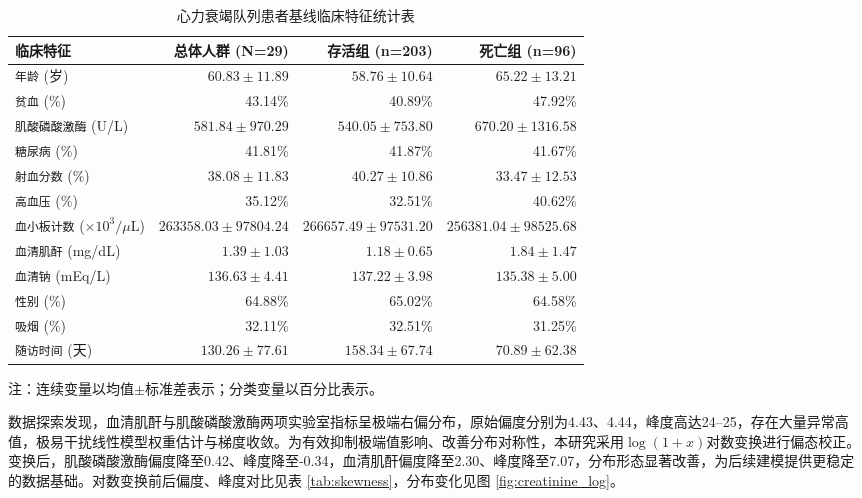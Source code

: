 \documentclass[11pt,a4paper]{ctexart} %
\begin{document}
\begin{table}[H]
\centering
\caption{心力衰竭队列患者基线临床特征统计表}
\label{tab:baseline}
\small
\begin{tabular}{lrrr}
\toprule
\textbf{临床特征} & \textbf{总体人群 (N=29)} & \textbf{存活组 (n=203)} & \textbf{死亡组 (n=96)} \\
\midrule
\texttt{年龄} (岁) & $60.83 \pm 11.89$ & $58.76 \pm 10.64$ & $65.22 \pm 13.21$ \\
\texttt{贫血} (\%) & \num{43.14}\% & \num{40.89}\% & \num{47.92}\% \\
\texttt{肌酸磷酸激酶} (U/L) & $581.84 \pm 970.29$ & $540.05 \pm 753.80$ & $670.20 \pm 1316.58$ \\
\texttt{糖尿病} (\%) & \num{41.81}\% & \num{41.87}\% & \num{41.67}\% \\
\texttt{射血分数} (\%) & $38.08 \pm 11.83$ & $40.27 \pm 10.86$ & $33.47 \pm 12.53$ \\
\texttt{高血压} (\%) & \num{35.12}\% & \num{32.51}\% & \num{40.62}\% \\
\texttt{血小板计数} ($\times 10^3/\mu\text{L}$) & $263358.03 \pm 97804.24$ & $266657.49 \pm 97531.20$ & $256381.04 \pm 98525.68$ \\
\texttt{血清肌酐} (mg/dL) & $1.39 \pm 1.03$ & $1.18 \pm 0.65$ & $1.84 \pm 1.47$ \\
\texttt{血清钠} (mEq/L) & $136.63 \pm 4.41$ & $137.22 \pm 3.98$ & $135.38 \pm 5.00$ \\
\texttt{性别} (\%) & \num{64.88}\% & \num{65.02}\% & \num{64.58}\% \\
\texttt{吸烟} (\%) & \num{32.11}\% & \num{32.51}\% & \num{31.25}\% \\
\texttt{随访时间} (天) & $130.26 \pm 77.61$ & $158.34 \pm 67.74$ & $70.89 \pm 62.38$ \\
\bottomrule
\end{tabular}
\begin{tablenotes}
    \footnotesize
    \item 注：连续变量以均值$\pm$标准差表示；分类变量以百分比表示。
\end{tablenotes}
\end{table}

数据探索发现，血清肌酐与肌酸磷酸激酶两项实验室指标呈极端右偏分布，原始偏度分别为4.43、4.44，峰度高达24–25，存在大量异常高值，极易干扰线性模型权重估计与梯度收敛。为有效抑制极端值影响、改善分布对称性，本研究采用$\log(1+x)$对数变换进行偏态校正。变换后，肌酸磷酸激酶偏度降至0.42、峰度降至-0.34，血清肌酐偏度降至2.30、峰度降至7.07，分布形态显著改善，为后续建模提供更稳定的数据基础。对数变换前后偏度、峰度对比见表 \ref{tab:skewness}，分布变化见图 \ref{fig:creatinine_log}。
\end{document}
